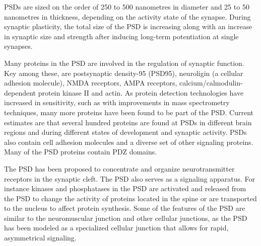 PSDs are sized on the order of 250 to 500 nanometres in diameter and 25 to 50 nanometres in thickness, depending on the activity state of the synapse. During synaptic plasticity, the total size of the PSD is increasing along with an increase in synaptic size and strength after inducing long-term potentiation at single synapses.

Many proteins in the PSD are involved in the regulation of synaptic function. Key among these, are postsynaptic density-95 (PSD95), neuroligin (a cellular adhesion molecule), NMDA receptors, AMPA receptors, calcium/calmodulin-dependent protein kinase II and actin. As protein detection technologies have increased in sensitivity, such as with improvements in mass spectrometry techniques, many more proteins have been found to be part of the PSD. Current estimates are that several hundred proteins are found at PSDs in different brain regions and during different states of development and synaptic activity. PSDs also contain cell adhesion molecules and a diverse set of other signaling proteins. Many of the PSD proteins contain PDZ domains.

The PSD has been proposed to concentrate and organize neurotransmitter receptors in the synaptic cleft. The PSD also serves as a signaling apparatus. For instance kinases and phosphatases in the PSD are activated and released from the PSD to change the activity of proteins located in the spine or are transported to the nucleus to affect protein synthesis. Some of the features of the PSD are similar to the neuromuscular junction and other cellular junctions, as the PSD has been modeled as a specialized cellular junction that allows for rapid, asymmetrical signaling.



